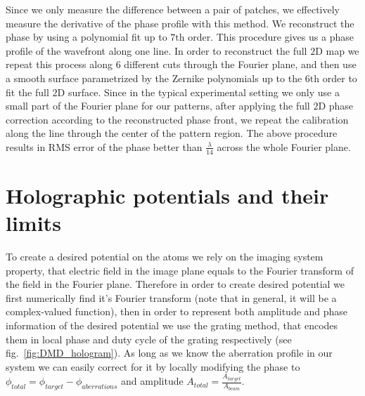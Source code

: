 Since we only measure the difference between a pair of patches, we effectively measure the derivative of the phase profile with this method. We reconstruct the phase by using a polynomial fit up to $7\mathrm{th}$ order. This procedure gives us a phase profile of the wavefront along one line. In order to reconstruct the full $2\mathrm{D}$ map we repeat this process along 6 different cuts through the Fourier plane, and then use a smooth surface parametrized by the Zernike polynomials up to the $6\mathrm{th}$ order to fit the full $2\mathrm{D}$ surface. Since in the typical experimental setting we only use a small part of the Fourier plane for our patterns, after applying the full $2\mathrm{D}$ phase correction according to the reconstructed phase front, we repeat the calibration along the line through the center of the pattern region. The above procedure results in RMS error of the phase better than $\frac{\lambda}{14}$ across the whole Fourier plane.

\section{Holographic potentials and their limits}
To create a desired potential on the atoms we rely on the imaging system property, that electric field in the image plane equals to the Fourier transform of the field in the Fourier plane. Therefore in order to create desired potential we first numerically find it's Fourier transform (note that in general, it will be a complex-valued function), then in order to represent both amplitude and phase information of the desired potential we use the grating method, that encodes them in local phase and duty cycle of the grating respectively (see fig.~\ref{fig:DMD_hologram}). As long as we know the aberration profile in our system we can easily correct for it by locally modifying the phase to $\phi_{total} = \phi_{target} - \phi_{aberrations}$ and amplitude $A_{total} = \frac{A_{target}}{A_{beam}}$.

